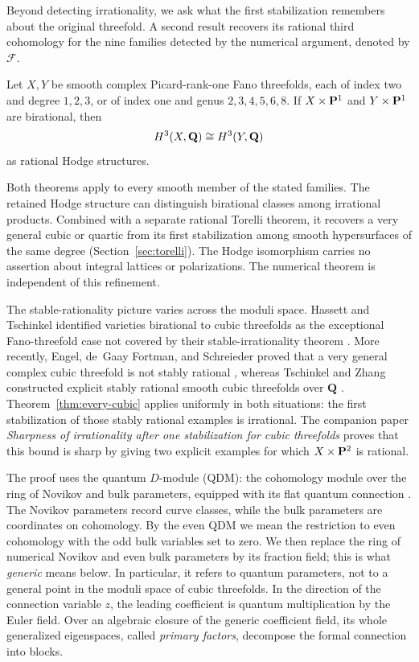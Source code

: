Beyond detecting irrationality, we ask what the first stabilization
remembers about the original threefold. A second result recovers its
rational third cohomology for the nine families detected by the numerical
argument, denoted by $\mathcal F$.

\begin{theorem}
\label{thm:hodge-conservation}%
Let $X,Y$ be smooth complex Picard-rank-one Fano threefolds, each of index
two and degree $1,2,3$, or of index one and genus $2,3,4,5,6,8$.
If $X\times\mathbf P^1$ and $Y\times\mathbf P^1$ are birational, then
\[
 H^3(X,\mathbf Q)\cong H^3(Y,\mathbf Q)
\]
as rational Hodge structures.
\end{theorem}

Both theorems apply to every smooth member of the stated families.
The retained Hodge structure can distinguish birational classes among
irrational products. Combined with a separate rational Torelli theorem,
it recovers a very general cubic or quartic from its first stabilization
among smooth hypersurfaces of the same degree (Section~\ref{sec:torelli}). The Hodge isomorphism carries no assertion about
integral lattices or polarizations. The numerical theorem is independent
of this refinement.

The stable-rationality picture varies across the moduli space.  Hassett and
Tschinkel identified varieties birational to cubic threefolds as the
exceptional Fano-threefold case not covered by their stable-irrationality
theorem \cite{HassettTschinkel}.  More recently, Engel, de~Gaay Fortman, and
Schreieder proved that a very general complex cubic threefold is not stably
rational \cite[Corollary~1.4]{EGFS}, whereas Tschinkel and Zhang constructed
explicit stably rational smooth cubic threefolds over \(\mathbf Q\)
\cite[Theorem~1.3]{TschinkelZhangTorsors}. Theorem~\ref{thm:every-cubic}
applies uniformly in both situations: the first stabilization of those
stably rational examples is irrational. The companion paper
\emph{Sharpness of irrationality after one stabilization for cubic threefolds}
\cite{RuddSharpness} proves that this bound is sharp by giving two explicit
examples for which \(X\times\mathbf P^2\) is rational.

The proof uses the quantum \(D\)-module (QDM): the cohomology module over the
ring of Novikov and bulk parameters, equipped with its flat quantum connection
\cite{IritaniQDM}.
The Novikov parameters record curve classes, while the bulk parameters are
coordinates on cohomology.  By the even QDM we mean the restriction to even
cohomology with the odd bulk variables set to zero.  We then
replace the ring of numerical Novikov and even bulk
parameters by its fraction field; this is what \emph{generic} means below.  In
particular, it refers to quantum parameters, not to a general point in the
moduli space of cubic threefolds.  In
the direction of the connection variable \(z\), the leading coefficient is
quantum multiplication by the Euler field.  Over an algebraic closure of the
generic coefficient field, its whole generalized eigenspaces, called
\emph{primary factors}, decompose the formal connection into blocks.

